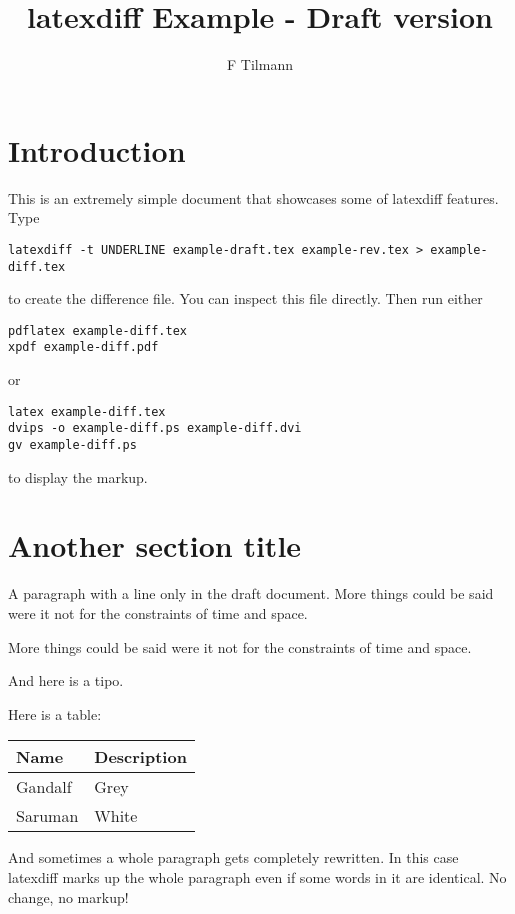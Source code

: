 \documentclass[12pt,a4paper]{article}
\title{latexdiff Example - Draft version}
\author{F Tilmann}
\begin{document}
\maketitle

\section*{Introduction}

This is an extremely simple document that showcases some of latexdiff features.
Type
\begin{verbatim}
latexdiff -t UNDERLINE example-draft.tex example-rev.tex > example-diff.tex
\end{verbatim}
to create the difference file.  You can inspect this file directly. Then run either 
\begin{verbatim}
pdflatex example-diff.tex
xpdf example-diff.pdf
\end{verbatim}
or
\begin{verbatim}
latex example-diff.tex
dvips -o example-diff.ps example-diff.dvi
gv example-diff.ps
\end{verbatim}
to display the markup.

\section*{Another section title}

A paragraph with a line only in the draft document.  More things could be said 
were it not for the constraints of time and space.

More things could be said were it not for the constraints of time and space.

And here is a tipo. 

Here is a table:


\begin{tabular}{ll}
Name & Description \\
\hline
Gandalf & Grey \\
Saruman & White
\end{tabular}


And sometimes a whole paragraph gets completely rewritten. In this
case latexdiff marks up the whole paragraph even if some words in it
are identical.
No change, no markup!
\end{document}
